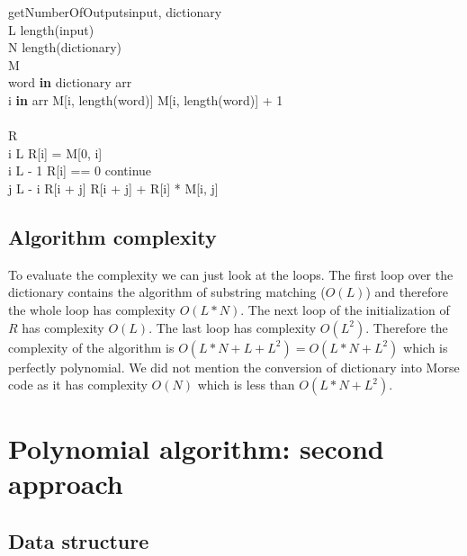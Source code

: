 \documentclass[a4paper]{article}
\begin{document}
\begin{pseudocode}[ruled]{getNumberOfOutputs}{input, dictionary}
 \\ 
L \GETS length(input)\\
N \GETS length(dictionary)\\
M \GETS {}\\
\FOR word \textbf{ in } dictionary \DO
	\BEGIN
	arr \GETS {}\\
    \FOR i \textbf{ in } arr \DO
    	M[i, length(word)] \GETS M[i, length(word)] + 1\\
    \END \\
R \GETS [] \\
\FOR i  \TO L \DO 
	R[i] = M[0, i] \\
\FOR i  \TO L - 1 \DO
	\BEGIN
    \IF R[i] == 0 \DO continue \\
    \FOR j  \TO L - i \DO
    	R[i + j] \GETS R[i + j] + R[i] * M[i, j]
    \END \\
\end{pseudocode}
\subsection{Algorithm complexity}
To evaluate the complexity we can just look at the loops. The first loop over the dictionary contains the algorithm of substring matching ($O(L)$) and therefore the whole loop has complexity $O(L*N)$. The next loop of the initialization of $R$ has complexity $O(L)$. The last loop has complexity $O(L^2)$. Therefore the complexity of the algorithm is $O(L*N + L + L^2) = O(L*N + L^2)$ which is perfectly polynomial. We did not mention the conversion of dictionary into Morse code as it has complexity $O(N)$ which is less than $O(L*N + L^2)$.

















\section{Polynomial algorithm: second approach}
\subsection{Data structure}
\end{document}
